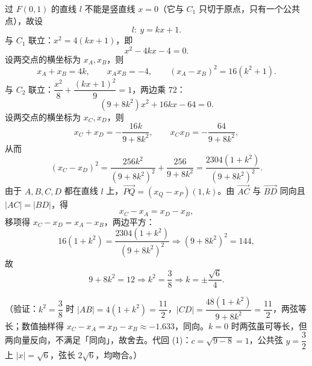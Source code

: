 \begin{answer}
过 \(F(0,1)\) 的直线 \(l\) 不能是竖直线 \(x=0\)（它与 \(C_1\) 只切于原点，只有一个公共点），故设
\nopagebreak[4]
\[
l:\ y=kx+1.
\]
与 \(C_1\) 联立：\(x^2=4(kx+1)\)，即
\nopagebreak[4]
\[
x^2-4kx-4=0.
\]
设两交点的横坐标为 \(x_A,x_B\)，则
\nopagebreak[4]
\[
x_A+x_B=4k,\qquad x_Ax_B=-4,\qquad
(x_A-x_B)^2=16(k^2+1).
\]
与 \(C_2\) 联立：\(\dfrac{x^2}{8}+\dfrac{(kx+1)^2}{9}=1\)，两边乘 \(72\)：
\nopagebreak[4]
\[
(9+8k^2)x^2+16kx-64=0.
\]
设两交点的横坐标为 \(x_C,x_D\)，则
\nopagebreak[4]
\[
x_C+x_D=-\dfrac{16k}{9+8k^2},\qquad
x_Cx_D=-\dfrac{64}{9+8k^2},
\]
从而
\nopagebreak[4]
\[
(x_C-x_D)^2
=\dfrac{256k^2}{(9+8k^2)^2}+\dfrac{256}{9+8k^2}
=\dfrac{2304(1+k^2)}{(9+8k^2)^2}.
\]
由于 \(A,B,C,D\) 都在直线 \(l\) 上，\(\overrightarrow{PQ}=(x_Q-x_P)(1,k)\)。由 \(\overrightarrow{AC}\) 与 \(\overrightarrow{BD}\) 同向且 \(|AC|=|BD|\)，得
\nopagebreak[4]
\[
x_C-x_A=x_D-x_B,
\]
移项得 \(x_C-x_D=x_A-x_B\)，两边平方：
\nopagebreak[4]
\[
16(1+k^2)=\dfrac{2304(1+k^2)}{(9+8k^2)^2}
\Longrightarrow (9+8k^2)^2=144,
\]
故
\nopagebreak[4]
\[
9+8k^2=12\Longrightarrow k^2=\dfrac38\Longrightarrow k=\pm\dfrac{\sqrt6}{4}.
\]

（验证：\(k^2=\dfrac38\) 时 \(|AB|=4(1+k^2)=\dfrac{11}{2}\)，\(|CD|=\dfrac{48(1+k^2)}{9+8k^2}=\dfrac{11}{2}\)，两弦等长；数值抽样得 \(x_C-x_A=x_D-x_B\approx-1.633\)，同向。\(k=0\) 时两弦虽可等长，但两向量反向，不满足「同向」，故舍去。代回 (1)：\(c=\sqrt{9-8}=1\)，公共弦 \(y=\dfrac32\) 上 \(|x|=\sqrt6\)，弦长 \(2\sqrt6\)，均吻合。）



\end{answer}
